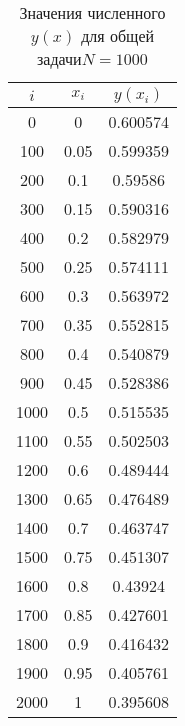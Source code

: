 \documentclass[a4paper,12pt,titlepage]{article}
\begin{document}
\begin{table}[h]
\centering
\begin{tabular}{|c|c|c|}
\hline
$i$ & $x_i$ & $y(x_i)$ \\
\hline
0&0&0.600574\\
100&0.05&0.599359\\
200&0.1&0.59586\\
300&0.15&0.590316\\
400&0.2&0.582979\\
500&0.25&0.574111\\
600&0.3&0.563972\\
700&0.35&0.552815\\
800&0.4&0.540879\\
900&0.45&0.528386\\
1000&0.5&0.515535\\
1100&0.55&0.502503\\
1200&0.6&0.489444\\
1300&0.65&0.476489\\
1400&0.7&0.463747\\
1500&0.75&0.451307\\
1600&0.8&0.43924\\
1700&0.85&0.427601\\
1800&0.9&0.416432\\
1900&0.95&0.405761\\
2000&1&0.395608\\
\hline
\end{tabular}
\caption{Значения численного $y(x)$ для общей задачи $N=1000$}
\label{table}
\end{table}


\newpage
\end{document}
